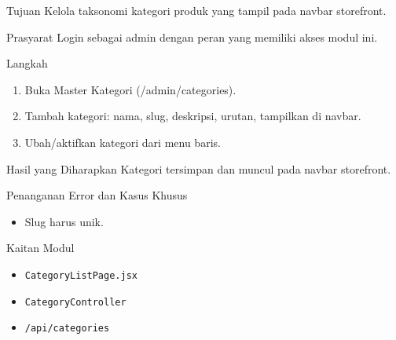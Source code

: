 
\begin{flowsection}{Tujuan}
Kelola taksonomi kategori produk yang tampil pada navbar storefront.
\end{flowsection}

\begin{flowsection}{Prasyarat}
Login sebagai admin dengan peran yang memiliki akses modul ini.
\end{flowsection}

\begin{flowsection}{Langkah}
\begin{enumerate}
  \item Buka Master Kategori (/admin/categories).
  \item Tambah kategori: nama, slug, deskripsi, urutan, tampilkan di navbar.
  \item Ubah/aktifkan kategori dari menu baris.
\end{enumerate}
\end{flowsection}


\begin{flowsection}{Hasil yang Diharapkan}
Kategori tersimpan dan muncul pada navbar storefront.
\end{flowsection}

\begin{flowsection}{Penanganan Error dan Kasus Khusus}
\begin{itemize}
  \item Slug harus unik.
\end{itemize}
\end{flowsection}

\begin{flowsection}{Kaitan Modul}
\begin{itemize}
  \item \texttt{CategoryListPage.jsx}
  \item \texttt{CategoryController}
  \item \texttt{/api/categories}
\end{itemize}
\end{flowsection}

